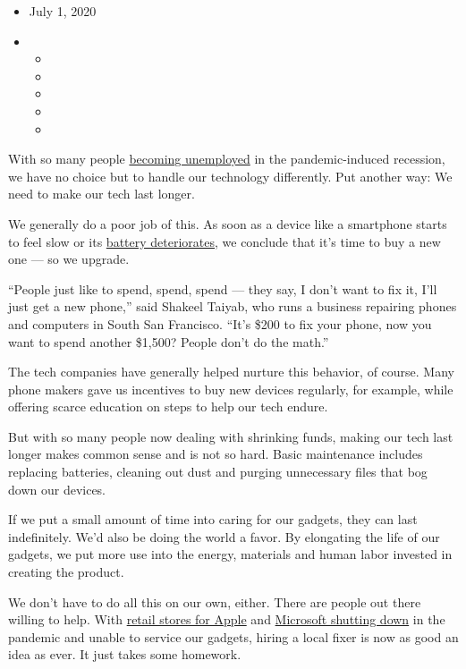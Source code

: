 \begin{itemize}
\item
  July 1, 2020
\item
  \begin{itemize}
  \item
  \item
  \item
  \item
  \item
  \end{itemize}
\end{itemize}

With so many people
\href{https://www.nytimes3xbfgragh.onion/2020/06/25/business/economy/coronavirus-unemployment-claims.html}{becoming
unemployed} in the pandemic-induced recession, we have no choice but to
handle our technology differently. Put another way: We need to make our
tech last longer.

We generally do a poor job of this. As soon as a device like a
smartphone starts to feel slow or its
\href{https://www.nytimes3xbfgragh.onion/2018/01/31/technology/personaltech/iphone-battery-slowing-down.html}{battery
deteriorates}, we conclude that it's time to buy a new one --- so we
upgrade.

``People just like to spend, spend, spend --- they say, I don't want to
fix it, I'll just get a new phone,'' said Shakeel Taiyab, who runs a
business repairing phones and computers in South San Francisco. ``It's
\$200 to fix your phone, now you want to spend another \$1,500? People
don't do the math.''

The tech companies have generally helped nurture this behavior, of
course. Many phone makers gave us incentives to buy new devices
regularly, for example, while offering scarce education on steps to help
our tech endure.

But with so many people now dealing with shrinking funds, making our
tech last longer makes common sense and is not so hard. Basic
maintenance includes replacing batteries, cleaning out dust and purging
unnecessary files that bog down our devices.

If we put a small amount of time into caring for our gadgets, they can
last indefinitely. We'd also be doing the world a favor. By elongating
the life of our gadgets, we put more use into the energy, materials and
human labor invested in creating the product.

We don't have to do all this on our own, either. There are people out
there willing to help. With
\href{https://www.nytimes3xbfgragh.onion/aponline/2020/06/19/business/bc-us-apple-store-closures.html}{retail
stores for Apple} and
\href{https://www.nytimes3xbfgragh.onion/aponline/2020/06/26/business/ap-microsoft-store-closures.html}{Microsoft
shutting down} in the pandemic and unable to service our gadgets, hiring
a local fixer is now as good an idea as ever. It just takes some
homework.

